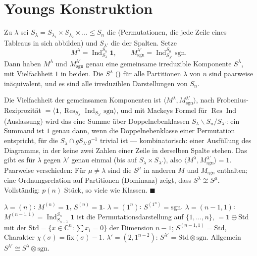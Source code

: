\section{Youngs Konstruktion}

\begin{merksatz}
Zu $\lambda$ sei $S_\lambda = S_{\lambda_1}\times S_{\lambda_2}\times\dots\le S_n$ die  (Permutationen, die jede Zeile eines Tableaus in sich abbilden) und $S_{\lambda'}$ die der Spalten. Setze
\[ M^{\lambda} = \operatorname{Ind}^{S_n}_{S_\lambda}\mathbf 1,\qquad M^{\lambda'}_{\mathrm{sgn}} = \operatorname{Ind}^{S_n}_{S_{\lambda'}}\mathrm{sgn} . \]
Dann haben $M^{\lambda}$ und $M^{\lambda'}_{\mathrm{sgn}}$ genau eine gemeinsame irreduzible Komponente $S^{\lambda}$, mit Vielfachheit $1$ in beiden. Die $S^{\lambda}$ () für alle Partitionen $\lambda$ von $n$ sind paarweise inäquivalent, und es sind alle irreduziblen Darstellungen von $S_n$.

Die Vielfachheit der gemeinsamen Komponenten ist $\langle M^{\lambda}, M^{\lambda'}_{\mathrm{sgn}}\rangle$, nach Frobenius-Reziprozität $= \langle\mathbf 1, \operatorname{Res}_{S_\lambda}\operatorname{Ind}_{S_{\lambda'}}\mathrm{sgn}\rangle$, und mit Mackeys Formel für $\operatorname{Res}\operatorname{Ind}$ (Auslassung) wird das eine Summe über Doppelnebenklassen $S_\lambda\backslash S_n/S_{\lambda'}$: ein Summand ist $1$ genau dann, wenn die Doppelnebenklasse einer Permutation entspricht, für die $S_\lambda\cap gS_{\lambda'}g^{-1}$ trivial ist --- kombinatorisch: einer Ausfüllung des Diagramms, in der keine zwei Zahlen einer Zeile in derselben Spalte stehen. Das gibt es für $\lambda$ gegen $\lambda'$ genau einmal (bis auf $S_\lambda\times S_{\lambda'}$), also $\langle M^{\lambda}, M^{\lambda'}_{\mathrm{sgn}}\rangle = 1$. Paarweise verschieden: Für $\mu\neq\lambda$ sind die $S^{\mu}$ in anderen $M$ und $M_{\mathrm{sgn}}$ enthalten; eine Ordnungsrelation auf Partitionen (Dominanz) zeigt, dass $S^{\lambda}\not\cong S^{\mu}$. Vollständig: $p(n)$ Stück, so viele wie Klassen. $\blacksquare$

$\lambda = (n)$: $M^{(n)} = \mathbf 1$, $S^{(n)} = \mathbf 1$. $\lambda = (1^{n})$: $S^{(1^{n})} = \mathrm{sgn}$. $\lambda = (n - 1, 1)$: $M^{(n-1,1)} = \operatorname{Ind}^{S_n}_{S_{n-1}}\mathbf 1$ ist die Permutationsdarstellung auf $\{1, \dots, n\}$, $= \mathbf 1\oplus\mathrm{Std}$ mit der  $\mathrm{Std} = \{x\in\mathbb C^{n}\colon\sum x_i = 0\}$ der Dimension $n - 1$; $S^{(n-1,1)} = \mathrm{Std}$, Charakter $\chi(\sigma) = \mathrm{fix}(\sigma) - 1$. $\lambda' = (2, 1^{n-2})$: $S^{\lambda'} = \mathrm{Std}\otimes\mathrm{sgn}$. Allgemein $S^{\lambda'}\cong S^{\lambda}\otimes\mathrm{sgn}$.


\end{merksatz}
